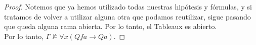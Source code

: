 \documentclass[letterpaper,10pt]{article}
\begin{document}
\begin{enumerate}
\begin{proof}
        \justify 
        Notemos que ya hemos utilizado todas nuestras hipótesis y fórmulas, 
        y si tratamos de volver a utilizar alguna otra que podamos 
        reutilizar, sigue pasando que queda alguna rama abierta. Por lo 
        tanto, el Tableaux es abierto. \\
        Por lo tanto, $\Gamma \not \models \forall x (Qfa \rightarrow Qa)$.
    \end{proof}
\end{enumerate}
\end{document}
